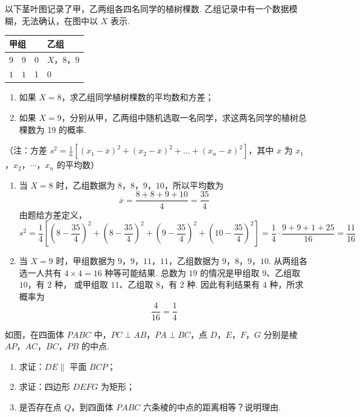 \begin{problem}
以下茎叶图记录了甲，乙两组各四名同学的植树棵数. 乙组记录中有一个数据模糊，无法确认，在图中以 \(X\) 表示.

\begin{center}
\begin{tabular}{r|c|l}
甲组 & & 乙组 \\
\hline
\(9\quad 9\) & 0 & \(X\)，\(8\)，\(9\) \\
\(1\quad 1\) & 1 & \(0\)
\end{tabular}
\end{center}

\begin{enumerate}
\item 如果 \(X = 8\)，求乙组同学植树棵数的平均数和方差；
\item 如果 \(X = 9\)，分别从甲，乙两组中随机选取一名同学，求这两名同学的植树总棵数为 19 的概率.
\end{enumerate}
（注：方差 \( s^2 = \frac{1}{n}\left[(x_1 - \overline{x})^2 + (x_2 - \overline{x})^2 + \ldots + (x_n - \overline{x})^2\right] \)，其中 \(\overline{x}\) 为 \(x_1\)，\(x_2\)，\(\cdots\)，\(x_n\) 的平均数）

\end{problem}

\begin{solution}
\begin{enumerate}
\item 当 \(X=8\) 时，乙组数据为 \(8\)，\(8\)，\(9\)，\(10\)，所以平均数为
\[
\overline{x}=\frac{8+8+9+10}{4}=\frac{35}{4}
\]
由题给方差定义，
\[
s^{2}=\frac{1}{4}\left[
\left(8-\frac{35}{4}\right)^{2}
+\left(8-\frac{35}{4}\right)^{2}
+\left(9-\frac{35}{4}\right)^{2}
+\left(10-\frac{35}{4}\right)^{2}\right]
=\frac{1}{4}\cdot\frac{9+9+1+25}{16}
=\frac{11}{16}
\]
\item 当 \(X=9\) 时，甲组数据为 \(9\)，\(9\)，\(11\)，\(11\)，乙组数据为
\(9\)，\(8\)，\(9\)，\(10\). 从两组各选一人共有 \(4\times4=16\) 种等可能结果.
总数为 \(19\) 的情况是甲组取 \(9\)、乙组取 \(10\)，有 \(2\) 种，
或甲组取 \(11\)、乙组取 \(8\)，有 \(2\) 种. 因此有利结果有
\(4\) 种，所求概率为
\[
\frac{4}{16}=\frac{1}{4}
\]
\end{enumerate}
\end{solution}

\begin{problem}
如图，在四面体 \(PABC\) 中，\(PC \perp AB\)，\(PA \perp BC\)，点 \(D\)，\(E\)，\(F\)，\(G\) 分别是棱 \(AP\)，\(AC\)，\(BC\)，\(PB\) 的中点.

\begin{enumerate}
\item 求证：\(DE \parallel\) 平面 \(BCP\)；
\item 求证：四边形 \(DEFG\) 为矩形；
\item 是否存在点 \(Q\)，到四面体 \(PABC\) 六条棱的中点的距离相等？说明理由.
\end{enumerate}

\end{problem}

